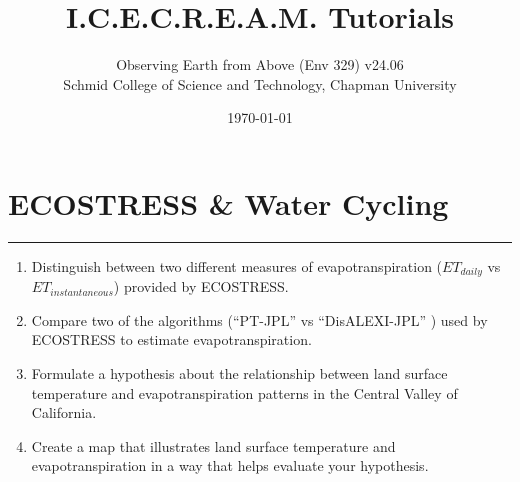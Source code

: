 \documentclass[oneside,a4paper,11pt,explicit]{book}
\title{I.C.E.C.R.E.A.M. Tutorials}
\subtitle{\small Observing Earth from Above (Env 329) v24.06 \\
	\small Schmid College of Science and Technology, Chapman University}
\date{\today}
\begin{document}
\dominitoc


\setcounter{chapter}{8} %

\chapter{ECOSTRESS \& Water Cycling} %

\vspace{-2em}

\minitoc

\hrule

\vspace{1em}

\begin{tcolorbox}[enhanced,frame style image=blueshade.png,
	opacityback=0.75,opacitybacktitle=0.25,
	colback=blue!5!white,colframe=blue!75!black,title={\Large \textbf{Objectives:}}]
	\large
	\begin{enumerate}
		\item Distinguish between two different measures of evapotranspiration ($ET_{daily}$ vs $ET_{instantaneous}$) provided by ECOSTRESS.
		\item  Compare two of the algorithms (``PT-JPL'' vs ``DisALEXI-JPL'' ) used by ECOSTRESS to estimate evapotranspiration.
		\item Formulate a hypothesis about the relationship between land surface temperature and evapotranspiration patterns in the Central Valley of California.
		\item Create a map that illustrates land surface temperature and evapotranspiration in a way that helps evaluate your hypothesis. 
	\end{enumerate}
\end{tcolorbox}

\clearpage

\fancyhead{}
\end{document}
